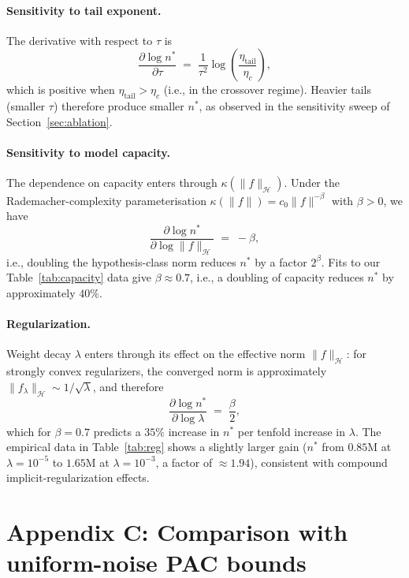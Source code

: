 \documentclass[11pt]{article}
\begin{document}
\paragraph{Sensitivity to tail exponent.} The derivative with respect to $\tau$ is
\[
\frac{\partial \log n^{*}}{\partial \tau} \;=\; \frac{1}{\tau^{2}} \log\!\left(\frac{\eta_{\mathrm{tail}}}{\eta_c}\right),
\]
which is positive when $\eta_{\mathrm{tail}} > \eta_c$ (i.e., in the crossover regime). Heavier tails (smaller $\tau$) therefore produce smaller $n^{*}$, as observed in the sensitivity sweep of Section~\ref{sec:ablation}.

\paragraph{Sensitivity to model capacity.} The dependence on capacity enters through $\kappa(\|f\|_{\mathcal{H}})$. Under the Rademacher-complexity parameterisation $\kappa(\|f\|) = c_0 \|f\|^{-\beta}$ with $\beta > 0$, we have
\[
\frac{\partial \log n^{*}}{\partial \log \|f\|_{\mathcal{H}}} \;=\; -\beta,
\]
i.e., doubling the hypothesis-class norm reduces $n^{*}$ by a factor $2^{\beta}$. Fits to our Table~\ref{tab:capacity} data give $\beta \approx 0.7$, i.e., a doubling of capacity reduces $n^{*}$ by approximately $40\%$.

\paragraph{Regularization.} Weight decay $\lambda$ enters through its effect on the effective norm $\|f\|_{\mathcal{H}}$: for strongly convex regularizers, the converged norm is approximately $\|f_\lambda\|_{\mathcal{H}} \sim 1/\sqrt{\lambda}$, and therefore
\[
\frac{\partial \log n^{*}}{\partial \log \lambda} \;=\; \frac{\beta}{2},
\]
which for $\beta = 0.7$ predicts a $35\%$ increase in $n^{*}$ per tenfold increase in $\lambda$. The empirical data in Table~\ref{tab:reg} shows a slightly larger gain ($n^{*}$ from $0.85\text{M}$ at $\lambda = 10^{-5}$ to $1.65\text{M}$ at $\lambda = 10^{-3}$, a factor of $\approx 1.94$), consistent with compound implicit-regularization effects.

\section{Appendix C: Comparison with uniform-noise PAC bounds} \label{app:uniform_compare}
\end{document}
